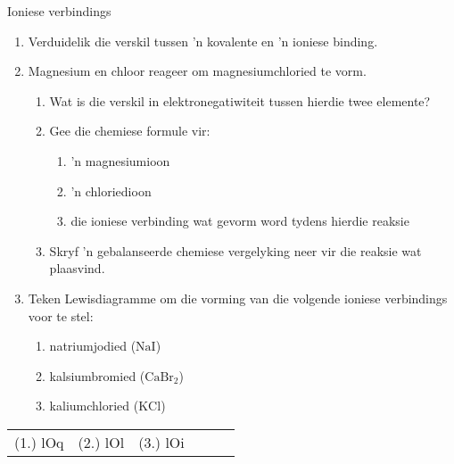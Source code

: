 \begin{exercises}{Ioniese verbindings}
{
            \nopagebreak
        \label{m38684*id142562}\begin{enumerate}[noitemsep, label=\textbf{\arabic*}. ] 
            \label{m38684*uid57}\item Verduidelik die verskil tussen 'n kovalente en 'n ioniese binding.\newline
\label{m38684*uid58}\item Magnesium en chloor reageer om magnesiumchloried te vorm.
\label{m38684*id142602}\begin{enumerate}[noitemsep, label=\textbf{\alph*}. ] 
            \label{m38684*uid59}\item Wat is die verskil in elektronegatiwiteit tussen hierdie twee elemente?
\label{m38684*uid60}\item Gee die chemiese formule vir:
\label{m38684*id142630}\begin{enumerate}[noitemsep, label=\textbf{\roman*}. ] 
            \label{m38684*uid61}\item 'n magnesiumioon
\label{m38684*uid62}\item 'n chloriedioon
\label{m38684*uid63}\item die ioniese verbinding wat gevorm word tydens hierdie reaksie
\end{enumerate}
        \label{m38684*uid64}\item Skryf 'n gebalanseerde chemiese vergelyking neer vir die reaksie wat plaasvind.
\end{enumerate}
        \label{m38684*uid65}\item Teken Lewisdiagramme om die vorming van die volgende ioniese verbindings voor te stel:
\label{m38684*id142697}\begin{enumerate}[noitemsep, label=\textbf{\alph*}. ] 
            \label{m38684*uid66}\item natriumjodied  ($\text{NaI}$)
\label{m38684*uid67}\item kalsiumbromied ($\text{CaBr}{}_{2}$)
\label{m38684*uid68}\item kaliumchloried ($\text{KCl}$)

\end{enumerate}
        \end{enumerate}

\practiceinfo
\begin{tabular}[h]{cccccc}
 (1.) lOq  &  (2.) lOl  &  (3.) lOi  &
\end{tabular}
}
\end{exercises}

